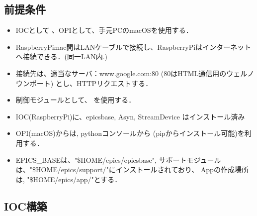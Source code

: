 \documentclass[letterpaper,10pt,dvipdfmx]{sphinxmanual}
\begin{document}
\subsection{前提条件}
\label{\detokenize{epics/rst/example1__httpRequest_to_Google:id2}}\begin{itemize}
\item {} 
IOCとして  、OPIとして、手元PCのmacOSを使用する．

\item {} 
RaspberryPi\sphinxhyphen{}mac間はLANケーブルで接続し、RaspberryPiはインターネットへ接続できる．(同一LAN内.)

\item {} 
接続先は、適当なサーバ：www.google.com:80 (80はHTML通信用のウェルノウンポート) とし、HTTPリクエストする．

\item {} 
制御モジュールとして、  を使用する．

\item {} 
IOC(RaspberryPi)に、epics\sphinxhyphen{}base, Asyn, StreamDevice はインストール済み

\item {} 
OPI(macOS)からは,  pythonコンソールから  (pipからインストール可能)を利用する．

\item {} 
EPICS\_BASEは、"\$HOME/epics/epics\sphinxhyphen{}base", サポートモジュールは、"\$HOME/epics/support/"にインストールされており、 Appの作成場所は, "\$HOME/epics/app/"とする．

\end{itemize}


\subsection{IOC構築}
\label{\detokenize{epics/rst/example1__httpRequest_to_Google:ioc}}
\end{document}
